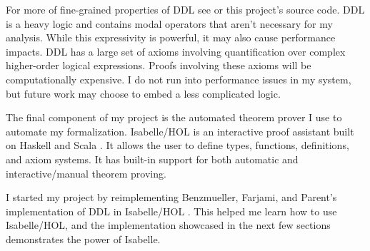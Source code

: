 \begin{isabellebody}
\begin{isamarkuptext}
For more of fine-grained properties of DDL see \citep{CJDDL} or this project's source code. DDL is a heavy logic and contains modal operators 
that aren't necessary for my analysis. While this expressivity is powerful, it may also cause performance
impacts. DDL has a large set of axioms involving quantification over complex higher-order
logical expressions. Proofs involving these axioms will be computationally expensive. I do not run 
into performance issues in my system, but future work may choose to embed a less complicated logic.%
\end{isamarkuptext}\isamarkuptrue%
%
\isadelimdocument
%
\endisadelimdocument
%
\isatagdocument
%
\isamarkuptrue%
%
\endisatagdocument
{\isafolddocument}%
%
\isadelimdocument
%
\endisadelimdocument
%
\begin{isamarkuptext}%
The final component of my project is the automated theorem prover I use to automate my formalization.
Isabelle/HOL is an interactive proof assistant built on Haskell and Scala \cite{isabelle}. It 
allows the user to define types, functions, definitions, and axiom systems. It has built-in support for both
automatic and interactive/manual theorem proving. 

I started my project by reimplementing Benzmueller, Farjami, and Parent's implementation 
of DDL in Isabelle/HOL \cite{BFP, logikey}. This helped me learn how to use Isabelle/HOL, and the implementation showcased in the 
next few sections demonstrates the power of Isabelle.


\end{isamarkuptext}
\end{isabellebody}
